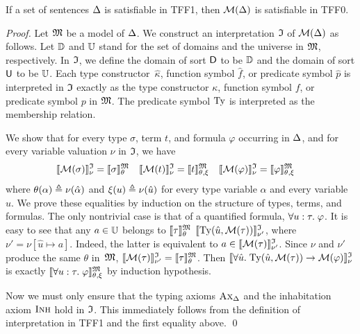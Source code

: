 \begin{theorem}%
\label{thm:mon_sound}%
\afterDot
If a set of sentences $\mathrm{\Delta}$ is satisfiable in TFF1,
then $\mathcal{M}(\mathrm{\Delta})$ is satisfiable in TFF0.
\end{theorem}
\begin{proof}
Let $\mathfrak{M}$ be a model of $\mathrm{\Delta}$.
We construct an interpretation $\mathfrak{I}$ of $\mathcal{M}(\mathrm{\Delta})$ as follows.
Let $\mathbb{D}$ and $\mathbb{U}$ stand for
the set of domains and the universe in $\mathfrak{M}$, respectively.
In $\mathfrak{I}$, we define the domain of sort $\mathsf{D}$ to be $\mathbb{D}$
and the domain of sort $\mathsf{U}$ to be $\mathbb{U}$.
Each type constructor~$\hat{\kappa}$, function symbol $\hat{f}$,
or predicate symbol $\hat{p}$ is interpreted in $\mathfrak{I}$
exactly as the type constructor $\kappa$, function symbol $f$,
or predicate symbol $p$ in $\mathfrak{M}$.
The predicate symbol $\mathrm{Ty}$ is interpreted as the membership relation.

We show that for every type $\sigma$, term $t$,
and formula $\varphi$ occurring in $\mathrm{\Delta}$, and
for every variable valuation $\nu$ in $\mathfrak{I}$, we have
\begin{align*}
\llbracket \mathcal{M}(\sigma) \rrbracket^{\mathfrak{I}}_{\nu} &= \llbracket \sigma \rrbracket^{\mathfrak{M}}_{\theta} &
\llbracket \mathcal{M}(t) \rrbracket^{\mathfrak{I}}_{\nu} &= \llbracket t \rrbracket^{\mathfrak{M}}_{\theta,\xi} &
\llbracket \mathcal{M}(\varphi) \rrbracket^{\mathfrak{I}}_{\nu} &= \llbracket \varphi \rrbracket^{\mathfrak{M}}_{\theta,\xi}
\end{align*}
where $\theta(\alpha) \mathrel{\triangleq} \nu(\hat{\alpha})$ and
$\xi(u) \mathrel{\triangleq} \nu(\hat{u})$ for every
type variable $\alpha$ and every variable $u$.
%
We prove these equalities by induction on the structure
of types, terms, and formulas. The only nontrivial case is
that of a quantified formula, $\forall u \mathrel{:} \tau .\; \varphi$.
It is easy to see that any $a \in \mathbb{U}$ belongs
to $\llbracket \tau \rrbracket^{\mathfrak{M}}_\theta$ \iff{}
$\llbracket \mathrm{Ty}(\hat{u},\mathcal{M}(\tau)) \rrbracket^{\mathfrak{I}}_{\nu'}$,
where $\nu' = \nu[\hat{u} \mapsto a]$.
Indeed, the latter is equivalent to
$a \in \llbracket \mathcal{M}(\tau) \rrbracket^{\mathfrak{I}}_{\nu'}$.
Since $\nu$ and $\nu'$ produce the same
$\theta$ in~$\mathfrak{M}$,
$\llbracket \mathcal{M}(\tau) \rrbracket^{\mathfrak{I}}_{\nu'} = \llbracket \tau \rrbracket^{\mathfrak{M}}_\theta$.
Then
$\llbracket \forall \hat{u} .\; \mathrm{Ty}(\hat{u},\mathcal{M}(\tau))
\rightarrow \mathcal{M}(\varphi) \rrbracket^{\mathfrak{I}}_{\nu}$ is exactly
$\llbracket \forall u \mathrel{:} \tau .\; \varphi \rrbracket^{\mathfrak{M}}_{\theta,\xi}$
by induction hypothesis.

Now we must only ensure that the typing axioms
$\text{\sc Ax}_{\mathrm{\Delta}}$ and the inhabitation axiom $\text{\sc Inh}$ hold in $\mathfrak{I}$.
This immediately follows from the definition of
interpretation in TFF1 and the first equality above.
\qed
\end{proof}

